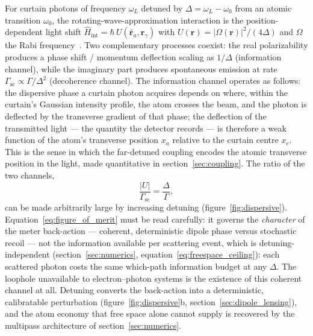 \documentclass[11pt,a4paper]{article}
\begin{document}
For curtain photons of frequency $\omega_L$ detuned by $\Delta = \omega_L - \omega_0$ from an atomic transition $\omega_0$, the rotating-wave-approximation interaction is the position-dependent light shift $\hat{H}_\text{int} = \hbar\,U(\hat{\mathbf{r}}_a, \mathbf{r}_\gamma)$ with $U(\mathbf{r}) = |\Omega(\mathbf{r})|^2/(4\Delta)$ and $\Omega$ the Rabi frequency~\cite{Grimm2000}. Two complementary processes coexist: the real polarizability produces a phase shift / momentum deflection scaling as $1/\Delta$ (information channel), while the imaginary part produces spontaneous emission at rate $\Gamma_\text{sc} \propto \Gamma/\Delta^2$ (decoherence channel). The information channel operates as follows: the dispersive phase a curtain photon acquires depends on where, within the curtain's Gaussian intensity profile, the atom crosses the beam, and the photon is deflected by the transverse gradient of that phase; the deflection of the transmitted light --- the quantity the detector records --- is therefore a weak function of the atom's transverse position $x_a$ relative to the curtain centre $x_c$. This is the sense in which the far-detuned coupling encodes the atomic transverse position in the light, made quantitative in section~\ref{sec:coupling}. The ratio of the two channels,
\begin{equation}
\frac{|U|}{\Gamma_\text{sc}} = \frac{\Delta}{\Gamma},
\label{eq:figure_of_merit}
\end{equation}
can be made arbitrarily large by increasing detuning (figure~\ref{fig:dispersive}). Equation~\eqref{eq:figure_of_merit} must be read carefully: it governs the \emph{character} of the meter back-action --- coherent, deterministic dipole phase versus stochastic recoil --- not the information available per scattering event, which is detuning-independent (section~\ref{sec:numerics}, equation~\eqref{eq:freespace_ceiling}): each scattered photon costs the same which-path information budget at any $\Delta$. The loophole unavailable to electron--photon systems is the existence of this coherent channel at all. Detuning converts the back-action into a deterministic, calibratable perturbation (figure~\ref{fig:dispersive}b, section~\ref{sec:dipole_lensing}), and the atom economy that free space alone cannot supply is recovered by the multipass architecture of section~\ref{sec:numerics}.
\end{document}
